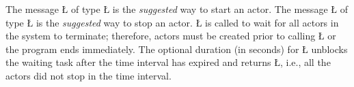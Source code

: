 \documentclass[openright,twoside]{report}
\begin{document}
The message \LGinlinetrue\LGbegin\lgrinde\L{}\endlgrinde\LGend{} of type \LGinlinetrue\LGbegin\lgrinde\L{}\endlgrinde\LGend{} is the \emph{suggested} way to start an actor.
The message \LGinlinetrue\LGbegin\lgrinde\L{}\endlgrinde\LGend{} of type \LGinlinetrue\LGbegin\lgrinde\L{}\endlgrinde\LGend{} is the \emph{suggested} way to stop an actor.
\LGinlinetrue\LGbegin\lgrinde\L{}\endlgrinde\LGend{} is called to wait for all actors in the system to terminate;
therefore, actors must be created prior to calling \LGinlinetrue\LGbegin\lgrinde\L{}\endlgrinde\LGend{} or the program ends immediately.
The optional duration (in seconds) for \LGinlinetrue\LGbegin\lgrinde\L{}\endlgrinde\LGend{} unblocks the waiting task after the time interval has expired and returns \LGinlinetrue\LGbegin\lgrinde\L{}\endlgrinde\LGend{}, i.e., all the actors did not stop in the time interval.
\end{document}

